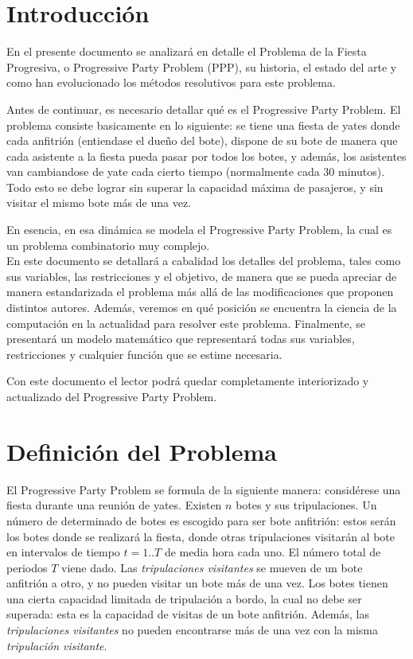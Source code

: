 \documentclass[letter, 10pt]{article}
\begin{document}
\section{Introducción}
En el presente documento se analizará en detalle el Problema de la Fiesta Progresiva, o Progressive Party Problem (PPP), su historia, el estado del arte y como han evolucionado los métodos resolutivos para este problema.

Antes de continuar, es necesario detallar qué es el Progressive Party Problem. El problema consiste basicamente en lo siguiente: se tiene una fiesta de yates donde cada anfitrión (entiendase el dueño del bote), dispone de su bote de manera que cada asistente a la fiesta pueda pasar por todos los botes, y además, los asistentes van cambiandose de yate cada cierto tiempo (normalmente cada 30 minutos). Todo esto se debe lograr sin superar la capacidad máxima de pasajeros, y sin visitar el mismo bote más de una vez.

En esencia, en esa dinámica se modela el Progressive Party Problem, la cual es un problema combinatorio muy complejo.\\

En este documento se detallará a cabalidad los detalles del problema, tales como sus variables, las restricciones y el objetivo, de manera que se pueda apreciar de manera estandarizada el problema más allá de las modificaciones que proponen distintos autores. Además, veremos en qué posición se encuentra la ciencia de la computación en la actualidad para resolver este problema. Finalmente, se presentará un modelo matemático que representará todas sus variables, restricciones y cualquier función que se estime necesaria.

Con este documento el lector podrá quedar completamente interiorizado y actualizado del Progressive Party Problem.

\section{Definición del Problema}

El Progressive Party Problem se formula de la siguiente manera: considérese una fiesta durante una reunión de yates. Existen $n$ botes y sus tripulaciones. Un número de determinado de botes es escogido para ser bote anfitrión: estos serán los botes donde se realizará la fiesta, donde otras tripulaciones visitarán al bote en intervalos de tiempo $t=1..T$ de media hora cada uno. El número total de periodos $T$ viene dado. Las \textit{tripulaciones visitantes} se mueven de un bote anfitrión a otro, y no pueden visitar un bote más de una vez. Los botes tienen una cierta capacidad limitada de tripulación a bordo, la cual no debe ser superada: esta es la capacidad de visitas de un bote anfitrión. Además, las \textit{tripulaciones visitantes} no pueden encontrarse más de una vez con la misma \textit{tripulación visitante}.
\end{document}
